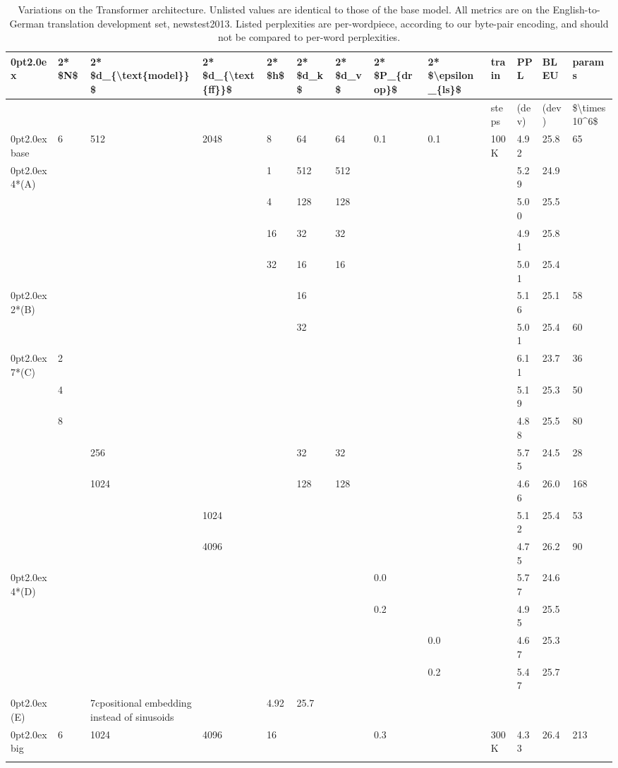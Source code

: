 \documentclass[11pt,a4paper]{article}
\begin{document}
\begin{table}[h]
\caption{Variations on the Transformer architecture. Unlisted values are identical to those of the base model.  All metrics are on the English-to-German translation development set, newstest2013.  Listed perplexities are per-wordpiece, according to our byte-pair encoding, and should not be compared to per-word perplexities.}
\begin{tabular}{|l|l|l|l|l|l|l|l|l|l|l|l|l|}
\hline
0pt2.0ex & 2* \$N\$ & 2* \$d\_\{\textbackslash{}text\{model\}\}\$ & 2* \$d\_\{\textbackslash{}text\{ff\}\}\$ & 2* \$h\$ & 2* \$d\_k\$ & 2* \$d\_v\$ & 2* \$P\_\{drop\}\$ & 2* \$\textbackslash{}epsilon\_\{ls\}\$ & train & PPL & BLEU & params \\ \hline
 &  &  &  &  &  &  &  &  & steps & (dev) & (dev) & \$\textbackslash{}times10\textasciicircum{}6\$ \\ \hline
0pt2.0ex base & 6 & 512 & 2048 & 8 & 64 & 64 & 0.1 & 0.1 & 100K & 4.92 & 25.8 & 65 \\ \hline
0pt2.0ex 4*(A) &  &  &  & 1 & 512 & 512 &  &  &  & 5.29 & 24.9 &  \\ \hline
 &  &  &  & 4 & 128 & 128 &  &  &  & 5.00 & 25.5 &  \\ \hline
 &  &  &  & 16 & 32 & 32 &  &  &  & 4.91 & 25.8 &  \\ \hline
 &  &  &  & 32 & 16 & 16 &  &  &  & 5.01 & 25.4 &  \\ \hline
0pt2.0ex 2*(B) &  &  &  &  & 16 &  &  &  &  & 5.16 & 25.1 & 58 \\ \hline
 &  &  &  &  & 32 &  &  &  &  & 5.01 & 25.4 & 60 \\ \hline
0pt2.0ex 7*(C) & 2 &  &  &  &  &  &  &  &  & 6.11 & 23.7 & 36 \\ \hline
 & 4 &  &  &  &  &  &  &  &  & 5.19 & 25.3 & 50 \\ \hline
 & 8 &  &  &  &  &  &  &  &  & 4.88 & 25.5 & 80 \\ \hline
 &  & 256 &  &  & 32 & 32 &  &  &  & 5.75 & 24.5 & 28 \\ \hline
 &  & 1024 &  &  & 128 & 128 &  &  &  & 4.66 & 26.0 & 168 \\ \hline
 &  &  & 1024 &  &  &  &  &  &  & 5.12 & 25.4 & 53 \\ \hline
 &  &  & 4096 &  &  &  &  &  &  & 4.75 & 26.2 & 90 \\ \hline
0pt2.0ex 4*(D) &  &  &  &  &  &  & 0.0 &  &  & 5.77 & 24.6 &  \\ \hline
 &  &  &  &  &  &  & 0.2 &  &  & 4.95 & 25.5 &  \\ \hline
 &  &  &  &  &  &  &  & 0.0 &  & 4.67 & 25.3 &  \\ \hline
 &  &  &  &  &  &  &  & 0.2 &  & 5.47 & 25.7 &  \\ \hline
0pt2.0ex (E) &  & 7cpositional embedding instead of sinusoids &  & 4.92 & 25.7 &  &  &  &  &  &  &  \\ \hline
0pt2.0ex big & 6 & 1024 & 4096 & 16 &  &  & 0.3 &  & 300K & 4.33 & 26.4 & 213 \\ \hline
 &  &  &  &  &  &  &  &  &  &  &  &  \\ \hline
\end{tabular}
\end{table}
\end{document}
